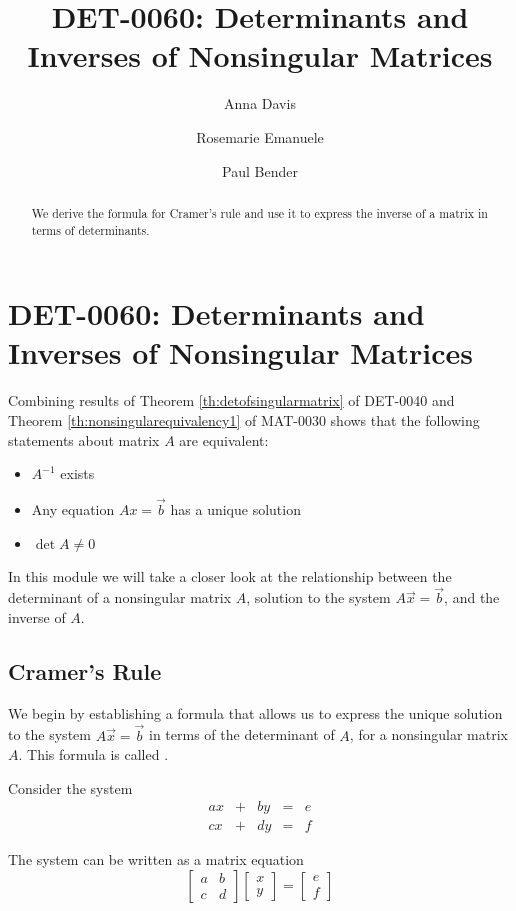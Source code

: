 \documentclass{ximera}
\author{Anna Davis \and Rosemarie Emanuele \and Paul Bender} \title{DET-0060: Determinants and Inverses of Nonsingular Matrices} \license{CC-BY 4.0}
\begin{document}
\begin{abstract}
 We derive the formula for Cramer's rule and use it to express the inverse of a matrix in terms of determinants.
\end{abstract}
\maketitle

\section*{DET-0060: Determinants and Inverses of Nonsingular Matrices}

Combining results of Theorem \ref{th:detofsingularmatrix} of DET-0040 and Theorem \ref{th:nonsingularequivalency1} of MAT-0030 shows that the following statements about matrix $A$ are equivalent:
\begin{itemize}
\item $A^{-1}$ exists
\item Any equation $Ax=\vec{b}$ has a unique solution
\item $\det{A}\neq 0$
\end{itemize}
In this module we will take a closer look at the relationship between the determinant of a nonsingular matrix $A$, solution to the system $A\vec{x}=\vec{b}$, and the inverse of $A$.  
\subsection*{Cramer's Rule}
We begin by establishing a formula that allows us to express the unique solution to the system $A\vec{x}=\vec{b}$ in terms of the determinant of $A$, for a nonsingular matrix $A$.  This formula is called .

Consider the system
$$\begin{array}{ccccc}
      ax& +&by&=&e\\
      cx & +&dy&= &f 
    \end{array}$$
    
 The system can be written as a matrix equation
 $$\begin{bmatrix}a&b\\c&d\end{bmatrix}\begin{bmatrix}x\\y\end{bmatrix}=\begin{bmatrix}e\\f\end{bmatrix}$$
 
\end{document}
